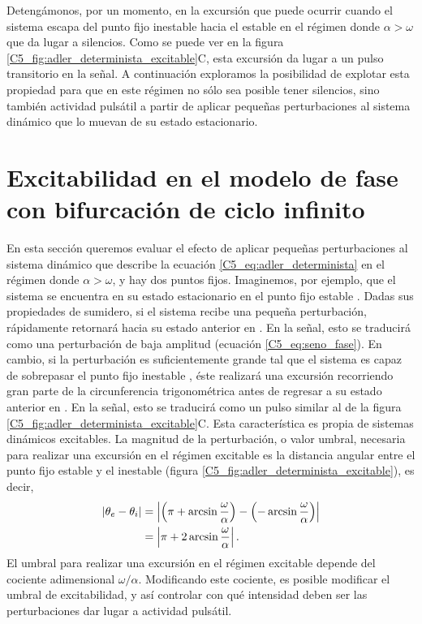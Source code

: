 \documentclass[./main.tex]{subfiles}
\begin{document}
Detengámonos, por un momento, en la excursión que puede ocurrir cuando el sistema escapa del punto fijo inestable hacia el estable en el régimen donde $\alpha > \omega$ que da lugar a silencios. Como se puede ver en la figura  \ref{C5_fig:adler_determinista_excitable}C, esta excursión da lugar a un pulso transitorio en la señal. A continuación exploramos la posibilidad de explotar esta propiedad para que en este régimen no sólo sea posible tener silencios, sino también actividad pulsátil a partir de aplicar pequeñas perturbaciones al sistema dinámico que lo muevan de su estado estacionario. 


\section{Excitabilidad en el modelo de fase con bifurcación de ciclo infinito}
\label{C5_sec:perturbacion}

En esta sección queremos evaluar el efecto de aplicar pequeñas perturbaciones al sistema dinámico que describe la ecuación \ref{C5_eq:adler_determinista} en el régimen donde $\alpha > \omega$, y  hay dos puntos fijos. Imaginemos, por ejemplo, que el sistema se encuentra en su estado estacionario en el punto fijo estable \xxe. Dadas sus propiedades de sumidero, si el sistema recibe una pequeña perturbación, rápidamente retornará hacia su estado anterior en \xxe. En la señal, esto se traducirá como una perturbación de baja amplitud (ecuación \ref{C5_eq:seno_fase}). En cambio, si la perturbación es suficientemente grande tal que el sistema es capaz de sobrepasar el punto fijo inestable \xxi, éste realizará una excursión recorriendo gran parte de la circunferencia trigonométrica antes de regresar a su estado anterior en \xxe. En la señal, esto se traducirá como un pulso similar al de la figura \ref{C5_fig:adler_determinista_excitable}C. Esta característica es propia de sistemas dinámicos excitables. La magnitud de la perturbación, o valor umbral, necesaria para realizar una excursión en el régimen excitable es la distancia angular entre el punto fijo estable y el inestable (figura \ref{C5_fig:adler_determinista_excitable}), es decir,
\begin{align}
    \left| \theta_e - \theta_i \right| &=  \left| \left(\pi + \arcsin{\frac{\omega}{\alpha}} \right) -  \left(-\arcsin{\frac{\omega}{\alpha}}\right)\right| \\
    &=  \left|\pi + 2 \arcsin{\frac{\omega}{\alpha}}\right|.
    \label{C5_eq:umbral}
\end{align}
El umbral para realizar una excursión en el régimen excitable depende del cociente adimensional $\omega/\alpha$. Modificando este cociente, es posible modificar el umbral de excitabilidad, y así controlar con qué intensidad deben ser las perturbaciones dar lugar a actividad pulsátil.
\end{document}

